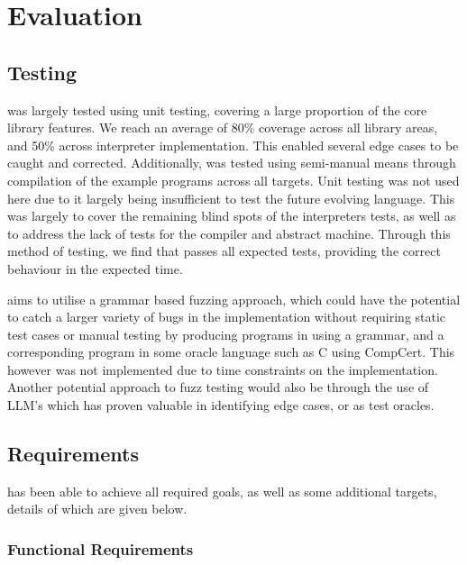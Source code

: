 \chapter{Evaluation}


\section{Testing}

\rimp was largely tested using unit testing, covering a large proportion of the core library features. We reach an average of 80\% coverage across all library areas, and 50\% across interpreter implementation.
This enabled several edge cases to be caught and corrected. Additionally, \rimp was tested using semi-manual means through compilation of the example programs across all targets. Unit testing was not used here due to it largely being insufficient to test the future evolving language. This was largely to cover the remaining blind spots of the interpreters tests, as well as to address the lack of tests for the compiler and abstract machine.
Through this method of testing, we find that \rimp passes all expected tests, providing the correct behaviour in the expected time.

\rimp aims to utilise a grammar based fuzzing approach\cite{GrammarFuzz}, which could have the potential to catch a larger variety of bugs in the implementation without requiring static test cases or manual testing by producing programs in \rimplang using a grammar, and a corresponding program in some oracle language such as C using CompCert\cite{CompCert}. This however was not implemented due to time constraints on the implementation. 
Another potential approach to fuzz testing would also be through the use of LLM's which has proven valuable in identifying edge cases, or as test oracles\cite{TestOracles, SearchGem5}.

\section{Requirements}

\rimp has been able to achieve all required goals, as well as some additional targets, details of which are given below.

\subsection{Functional Requirements}

